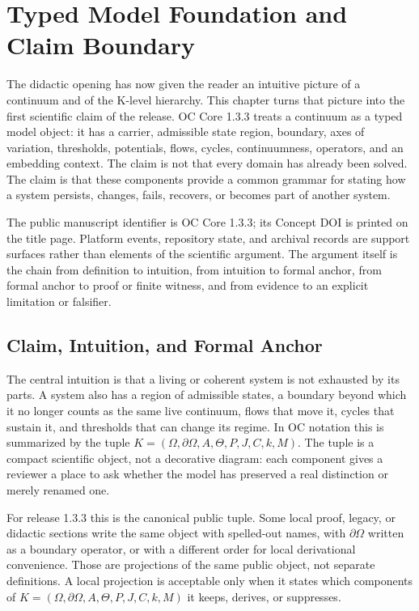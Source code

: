 \section{Typed Model Foundation and Claim Boundary}
\label{sec:oc133-integrated-scientific-closure}
The didactic opening has now given the reader an intuitive picture of a continuum and of the K-level hierarchy. This chapter turns that picture into the first scientific claim of the release. OC Core 1.3.3 treats a continuum as a typed model object: it has a carrier, admissible state region, boundary, axes of variation, thresholds, potentials, flows, cycles, continuumness, operators, and an embedding context. The claim is not that every domain has already been solved. The claim is that these components provide a common grammar for stating how a system persists, changes, fails, recovers, or becomes part of another system.

The public manuscript identifier is OC Core 1.3.3; its Concept DOI is printed on the title page. Platform events, repository state, and archival records are support surfaces rather than elements of the scientific argument. The argument itself is the chain from definition to intuition, from intuition to formal anchor, from formal anchor to proof or finite witness, and from evidence to an explicit limitation or falsifier.

\subsection{Claim, Intuition, and Formal Anchor}
The central intuition is that a living or coherent system is not exhausted by its parts. A system also has a region of admissible states, a boundary beyond which it no longer counts as the same live continuum, flows that move it, cycles that sustain it, and thresholds that can change its regime. In OC notation this is summarized by the tuple \(K=(\Omega,\partial\Omega,A,\Theta,P,J,C,k,M)\). The tuple is a compact scientific object, not a decorative diagram: each component gives a reviewer a place to ask whether the model has preserved a real distinction or merely renamed one.

For release 1.3.3 this is the canonical public tuple. Some local proof, legacy, or didactic sections write the same object with spelled-out names, with \(\partial\Omega\) written as a boundary operator, or with a different order for local derivational convenience. Those are projections of the same public object, not separate definitions. A local projection is acceptable only when it states which components of \(K=(\Omega,\partial\Omega,A,\Theta,P,J,C,k,M)\) it keeps, derives, or suppresses.

